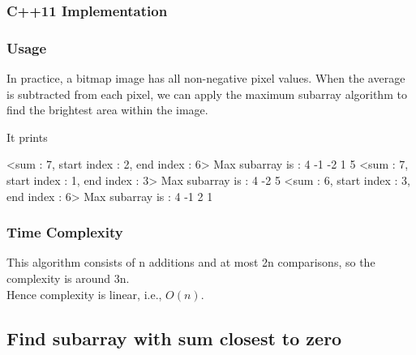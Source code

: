 \subsubsection{C++11 Implementation}


\subsubsection{Usage}
In practice, a bitmap image has all non-negative pixel values. When the average is subtracted from each pixel, we can apply the maximum subarray algorithm to find the brightest area within the image.


It prints
\begin{boxedverbatim}
<sum : 7, start index : 2, end index : 6> 
Max subarray is : {4 -1 -2 1 5}
<sum : 7, start index : 1, end index : 3> 
Max subarray is : {4 -2 5}
<sum : 6, start index : 3, end index : 6> 
Max subarray is : {4 -1 2 1}
\end{boxedverbatim}

\subsubsection{Time Complexity}
This algorithm consists of n additions and at most 2n comparisons, so the complexity is around 3n. 
\vspace{1mm}\\
Hence complexity is linear, i.e., $O(n)$.

\subsection{Find subarray with sum closest to zero}
\qquad {}

\vspace{1mm}

